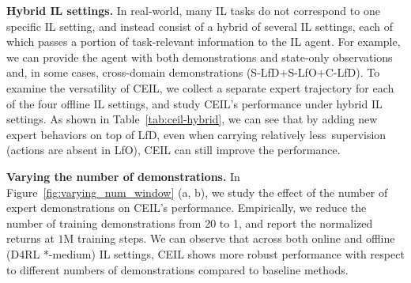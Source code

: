 \begin{table}
    \vspace{-10pt}
	\centering
    \vspace{-5pt}
	\caption{{\small The normalized results of CEIL, showing that CEIL can consistently digest useful (task-relevant) information and boost its performance, even under a hybrid of offline IL settings.}}
	\label{tab:ceil-hybrid}
    \vspace{-5pt}
\end{table}
\textbf{Hybrid IL settings.} In real-world, many IL tasks do not correspond to one specific IL setting, and instead consist of a hybrid of several IL settings, each of which passes a portion of task-relevant information to the IL agent. For example, we can provide the agent with both demonstrations and state-only observations and, in some cases, cross-domain demonstrations (S-LfD+S-LfO+C-LfD). To examine the versatility of CEIL, we collect a separate expert trajectory for each of the four offline IL settings, and study CEIL's performance under hybrid IL settings. As shown in Table~\ref{tab:ceil-hybrid}, we can see that by adding new expert behaviors on top of LfD, even when carrying relatively less~supervision (\eg actions are absent in LfO), CEIL can still improve the performance. %




\textbf{Varying the number of demonstrations.} In Figure~\ref{fig:varying_num_window} (a, b), we study the effect of the number of expert demonstrations on CEIL's performance. Empirically, we reduce the number of training demonstrations from 20 to 1, and report the normalized returns at $1 \text{M}$ training steps. We can observe that across both online and offline (D4RL *-medium) IL settings, CEIL shows more robust performance with respect to different numbers of demonstrations compared to baseline methods. 

